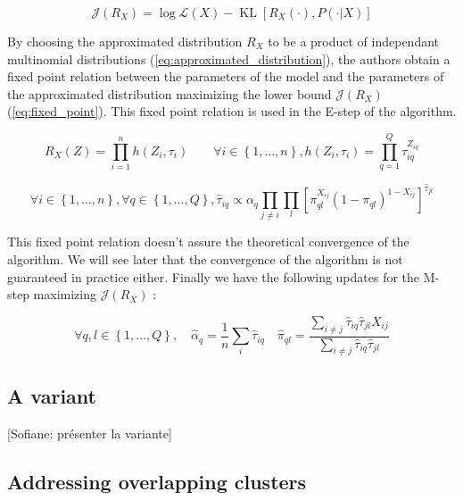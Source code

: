 \documentclass[11pt]{article}
\DeclareMathOperator*{\KL}{KL}
\begin{document}
\begin{equation}
    \label{eq:lower_bound}
    \mathcal{J}(R_X)=\log \mathcal{L}(X)-\KL[R_X(\cdot), P(\cdot|X)]
\end{equation}

By choosing the approximated distribution $R_X$ to be a product of independant multinomial distributions (\ref{eq:approximated_distribution}), the authors obtain a fixed point relation between the parameters of the model and the parameters of the approximated distribution maximizing the lower bound $\mathcal{J}(R_X)$ (\ref{eq:fixed_point}). This fixed point relation is used in the E-step of the algorithm.

\begin{equation}
    \label{eq:approximated_distribution}
    R_X(Z)=\prod_{i=1}^n h(Z_i, \tau_i) \quad\quad \forall i \in \left\{1,\dots,n\right\}, h(Z_i, \tau_i)=\prod_{q=1}^Q \tau_{iq}^{Z_{iq}}
\end{equation}

\begin{equation}
    \label{eq:fixed_point}
    \forall i \in \left\{1,\dots,n\right\}, \forall q \in \left\{1,\dots,Q\right\}, \hat{\tau}_{iq}\propto \alpha_q \prod_{j\neq i}\prod_l \left[\pi_{ql}^{X_{ij}}(1-\pi_{ql})^{1-X_{ij}}\right]^{\hat{\tau}_{jl}}
\end{equation}

This fixed point relation doesn't assure the theoretical convergence of the algorithm. We will see later that the convergence of the algorithm is not guaranteed in practice either. Finally we have the following updates for the M-step maximizing $\mathcal{J}(R_X)$ :

\begin{equation}
    \label{eq:m_step}
    \forall q, l \in \left\{1,\dots,Q\right\}, \quad
    \hat{\alpha}_q=\frac{1}{n}\sum_{i} \hat{\tau}_{iq}
    \quad
    \hat{\pi}_{ql}=\frac{\sum_{i\neq j} \hat{\tau}_{iq}\hat{\tau}_{jl}X_{ij}}{\sum_{i\neq j} \hat{\tau}_{iq}\hat{\tau}_{jl}}
\end{equation}


\subsection{A variant}

[Sofiane: présenter la variante]


\subsection{Addressing overlapping clusters}
\end{document}
